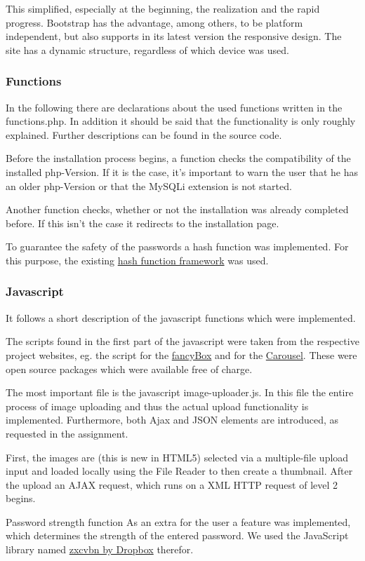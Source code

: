 \documentclass[a4paper,12pt,oneside]{article} %
\begin{document}
This simplified, especially at the beginning, the realization and the rapid progress.
Bootstrap has the advantage, among others, to be platform independent, but also supports in its
latest version the \textquotedbl{}responsive design\textquotedbl{}. The site has a dynamic structure,
regardless of which device was used.

\subsubsection{Functions}
In the following there are declarations about the used functions written in the functions.php.
In addition it should be said that the functionality is only roughly explained. Further descriptions can be found in the source code.

Before the installation process begins, a function checks the compatibility of the installed php-Version. If it is the case, it's important to warn the user that he has an older php-Version or that the MySQLi extension is not started.

Another function checks, whether or not the installation was already completed before. If this isn't the case it redirects to the installation page.

To guarantee the safety of the passwords a hash function was implemented.
For this purpose, the existing \hyperlink{http://www.openwall.com/phpass/}{hash function framework} was used.

\subsubsection{Javascript}
It follows a short description of the javascript functions which were implemented.

The scripts found in the first part of the javascript were taken from the respective project websites, eg. the script for the  \hyperlink{http://fancyapps.com/fancybox/}{fancyBox} and for the \hyperlink{http://getbootstrap.com/javascript/\#carousel}{Carousel}. These were open source packages which were available free of charge.

The most important file is the javascript image-uploader.js.
In this file the entire process of image uploading and thus the actual upload functionality is implemented. Furthermore, both Ajax and JSON elements are introduced, as requested in the assignment.

First, the images are (this is new in HTML5) selected via a multiple-file upload input and loaded locally using the File Reader to then create a thumbnail. After the upload an AJAX request, which runs on a XML HTTP request of level 2 begins.

Password strength function
As an extra for the user a feature was implemented, which determines the strength of the entered password. We used the JavaScript library named \hyperlink{https://tech.dropbox.com/2012/04/zxcvbn-realistic-password-strength-estimation/}{zxcvbn by Dropbox} therefor.
\end{document}
